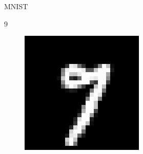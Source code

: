 \documentclass{beamer}
\begin{document}
\begin{frame}{MNIST}
\begin{minipage}[t]{0.32\columnwidth}
{\begin{minipage}[t]{0.25\columnwidth}
				\LARGE{9}
		\end{minipage}}
		\begin{figure}
			\includegraphics[width=1\columnwidth]{pres_pics/high_conf/97}
		\end{figure}
	\end{minipage}
\hfill
	\begin{minipage}[t]{0.32\columnwidth}
		\begin{figure}

\end{figure}
\end{minipage}
\end{frame}
\end{document}
